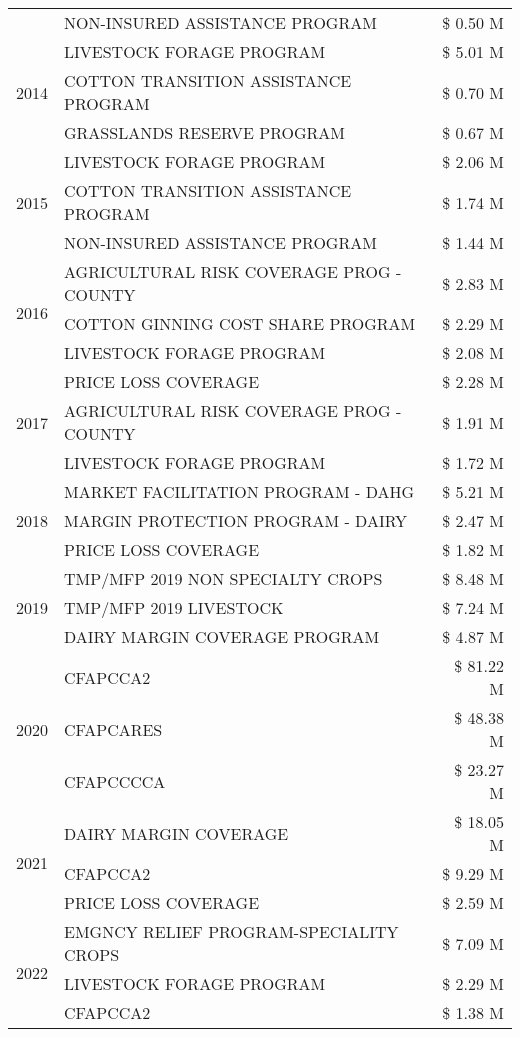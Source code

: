 \begin{tabular}{llr}
 & NON-INSURED ASSISTANCE PROGRAM & \$ 0.50 M \\
\cline{1-3}
\multirow[t]{3}{*}{2014} & LIVESTOCK FORAGE PROGRAM & \$ 5.01 M \\
 & COTTON TRANSITION ASSISTANCE PROGRAM & \$ 0.70 M \\
 & GRASSLANDS RESERVE PROGRAM & \$ 0.67 M \\
\cline{1-3}
\multirow[t]{3}{*}{2015} & LIVESTOCK FORAGE PROGRAM & \$ 2.06 M \\
 & COTTON TRANSITION ASSISTANCE PROGRAM & \$ 1.74 M \\
 & NON-INSURED ASSISTANCE PROGRAM & \$ 1.44 M \\
\cline{1-3}
\multirow[t]{3}{*}{2016} & AGRICULTURAL RISK COVERAGE PROG - COUNTY & \$ 2.83 M \\
 & COTTON GINNING COST SHARE PROGRAM & \$ 2.29 M \\
 & LIVESTOCK FORAGE PROGRAM & \$ 2.08 M \\
\cline{1-3}
\multirow[t]{3}{*}{2017} & PRICE LOSS COVERAGE & \$ 2.28 M \\
 & AGRICULTURAL RISK COVERAGE PROG - COUNTY & \$ 1.91 M \\
 & LIVESTOCK FORAGE PROGRAM & \$ 1.72 M \\
\cline{1-3}
\multirow[t]{3}{*}{2018} & MARKET FACILITATION PROGRAM - DAHG & \$ 5.21 M \\
 & MARGIN PROTECTION PROGRAM - DAIRY & \$ 2.47 M \\
 & PRICE LOSS COVERAGE & \$ 1.82 M \\
\cline{1-3}
\multirow[t]{3}{*}{2019} & TMP/MFP 2019 NON SPECIALTY CROPS & \$ 8.48 M \\
 & TMP/MFP 2019 LIVESTOCK & \$ 7.24 M \\
 & DAIRY MARGIN COVERAGE PROGRAM & \$ 4.87 M \\
\cline{1-3}
\multirow[t]{3}{*}{2020} & CFAPCCA2 & \$ 81.22 M \\
 & CFAPCARES & \$ 48.38 M \\
 & CFAPCCCCA & \$ 23.27 M \\
\cline{1-3}
\multirow[t]{3}{*}{2021} & DAIRY MARGIN COVERAGE & \$ 18.05 M \\
 & CFAPCCA2 & \$ 9.29 M \\
 & PRICE LOSS COVERAGE & \$ 2.59 M \\
\cline{1-3}
\multirow[t]{3}{*}{2022} & EMGNCY RELIEF PROGRAM-SPECIALITY CROPS & \$ 7.09 M \\
 & LIVESTOCK FORAGE PROGRAM & \$ 2.29 M \\
 & CFAPCCA2 & \$ 1.38 M \\
\cline{1-3}
\bottomrule
\end{tabular}
